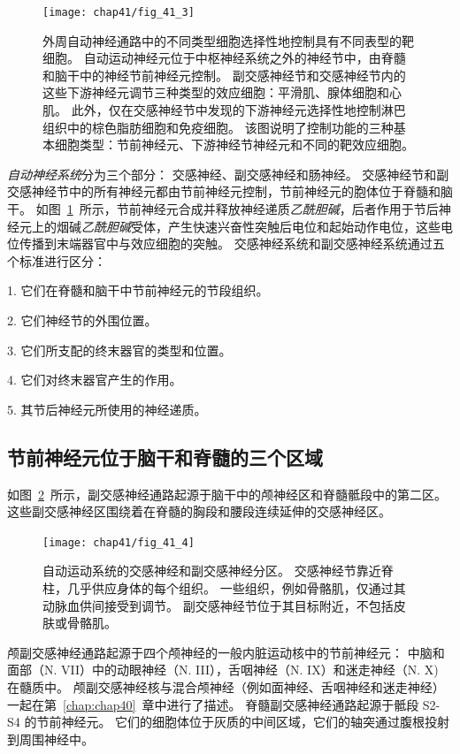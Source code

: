 \begin{figure}[htbp]
	\centering
	\texttt{[image: chap41/fig\_41\_3]}
	\caption{外周自动神经通路中的不同类型细胞选择性地控制具有不同表型的靶细胞。
		自动运动神经元位于中枢神经系统之外的神经节中，由脊髓和脑干中的神经节前神经元控制。
		副交感神经节和交感神经节内的这些下游神经元调节三种类型的效应细胞：平滑肌、腺体细胞和心肌。
		此外，仅在交感神经节中发现的下游神经元选择性地控制淋巴组织中的棕色脂肪细胞和免疫细胞。
		该图说明了控制功能的三种基本细胞类型：节前神经元、下游神经节神经元和不同的靶效应细胞。}
	\label{fig:41_3}
\end{figure}


\textit{自动神经系统}分为三个部分：
交感神经、副交感神经和肠神经。
交感神经节和副交感神经节中的所有神经元都由节前神经元控制，节前神经元的胞体位于脊髓和脑干。
如图~\ref{fig:41_3}~所示，节前神经元合成并释放神经递质\textit{乙酰胆碱}，后者作用于节后神经元上的烟碱\textit{乙酰胆碱}受体，产生快速兴奋性突触后电位和起始动作电位，这些电位传播到末端器官中与效应细胞的突触。
交感神经系统和副交感神经系统通过五个标准进行区分：

1. 它们在脊髓和脑干中节前神经元的节段组织。

2. 它们神经节的外围位置。

3. 它们所支配的终末器官的类型和位置。

4. 它们对终末器官产生的作用。

5. 其节后神经元所使用的神经递质。



\subsection{节前神经元位于脑干和脊髓的三个区域}

如图~\ref{fig:41_4}~所示，副交感神经通路起源于脑干中的颅神经区和脊髓骶段中的第二区。
这些副交感神经区围绕着在脊髓的胸段和腰段连续延伸的交感神经区。


\begin{figure}[htbp]
	\centering
	\texttt{[image: chap41/fig\_41\_4]}
	\caption{自动运动系统的交感神经和副交感神经分区。
		交感神经节靠近脊柱，几乎供应身体的每个组织。
		一些组织，例如骨骼肌，仅通过其动脉血供间接受到调节。
		副交感神经节位于其目标附近，不包括皮肤或骨骼肌。}
	\label{fig:41_4}
\end{figure}


颅副交感神经通路起源于四个颅神经的一般内脏运动核中的节前神经元：
中脑和面部（N. VII）中的动眼神经（N. III），舌咽神经（N. IX）和迷走神经（N. X) 在髓质中。
颅副交感神经核与混合颅神经（例如面神经、舌咽神经和迷走神经）一起在第~\ref{chap:chap40}~章中进行了描述。
脊髓副交感神经通路起源于骶段 S2-S4 的节前神经元。
它们的细胞体位于灰质的中间区域，它们的轴突通过腹根投射到周围神经中。


